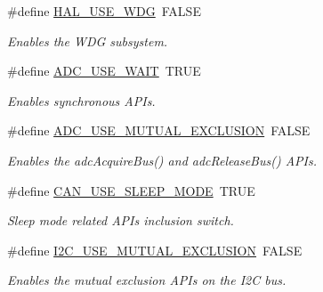 \begin{DoxyCompactItemize}
\hypertarget{group__HAL__CONF_gac3be0803223f25a5edeed87f56b526c3}{}\label{group__HAL__CONF_gac3be0803223f25a5edeed87f56b526c3} 
\#define \hyperlink{group__HAL__CONF_gac3be0803223f25a5edeed87f56b526c3}{H\+A\+L\+\_\+\+U\+S\+E\+\_\+\+W\+DG}~F\+A\+L\+SE
\begin{DoxyCompactList}\small\item\em Enables the W\+DG subsystem. \end{DoxyCompactList}\item 
\#define \hyperlink{group__HAL__CONF_ga39e892a4090185fbdda9bb105bc03b4f}{A\+D\+C\+\_\+\+U\+S\+E\+\_\+\+W\+A\+IT}~T\+R\+UE
\begin{DoxyCompactList}\small\item\em Enables synchronous A\+P\+Is. \end{DoxyCompactList}\item 
\#define \hyperlink{group__HAL__CONF_gac0893cb47e338c2dabad34b974a0a88d}{A\+D\+C\+\_\+\+U\+S\+E\+\_\+\+M\+U\+T\+U\+A\+L\+\_\+\+E\+X\+C\+L\+U\+S\+I\+ON}~F\+A\+L\+SE
\begin{DoxyCompactList}\small\item\em Enables the {\ttfamily adc\+Acquire\+Bus()} and {\ttfamily adc\+Release\+Bus()} A\+P\+Is. \end{DoxyCompactList}\item 
\hypertarget{group__HAL__CONF_ga5294d9d12e4186c781df3b2f1d8bd80b}{}\label{group__HAL__CONF_ga5294d9d12e4186c781df3b2f1d8bd80b} 
\#define \hyperlink{group__HAL__CONF_ga5294d9d12e4186c781df3b2f1d8bd80b}{C\+A\+N\+\_\+\+U\+S\+E\+\_\+\+S\+L\+E\+E\+P\+\_\+\+M\+O\+DE}~T\+R\+UE
\begin{DoxyCompactList}\small\item\em Sleep mode related A\+P\+Is inclusion switch. \end{DoxyCompactList}\item 
\hypertarget{group__HAL__CONF_ga7125642404a6fd3d4985d1cb6e1b7b0a}{}\label{group__HAL__CONF_ga7125642404a6fd3d4985d1cb6e1b7b0a} 
\#define \hyperlink{group__HAL__CONF_ga7125642404a6fd3d4985d1cb6e1b7b0a}{I2\+C\+\_\+\+U\+S\+E\+\_\+\+M\+U\+T\+U\+A\+L\+\_\+\+E\+X\+C\+L\+U\+S\+I\+ON}~F\+A\+L\+SE
\begin{DoxyCompactList}\small\item\em Enables the mutual exclusion A\+P\+Is on the I2C bus. \end{DoxyCompactList}\item 
\hypertarget{group__HAL__CONF_gad763d9426413cf2fe3922ebb8578bc59}{}\label{group__HAL__CONF_gad763d9426413cf2fe3922ebb8578bc59} 

\end{DoxyCompactItemize}
